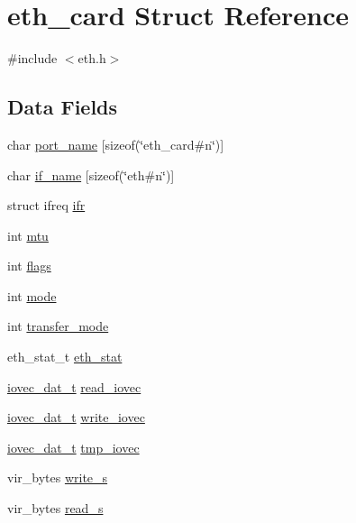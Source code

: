 \hypertarget{structeth__card}{}\section{eth\+\_\+card Struct Reference}
\label{structeth__card}


{\ttfamily \#include $<$eth.\+h$>$}

\subsection*{Data Fields}
\begin{DoxyCompactItemize}
\item 
char \hyperlink{structeth__card_aac454ceb9ecfa543e7aaac535e33e536}{port\+\_\+name} \mbox{[}sizeof(\char`\"{}eth\+\_\+card\#n\char`\"{})\mbox{]}
\item 
char \hyperlink{structeth__card_ad615009a0f37efe148e0d0f20487670b}{if\+\_\+name} \mbox{[}sizeof(\char`\"{}eth\#n\char`\"{})\mbox{]}
\item 
struct ifreq \hyperlink{structeth__card_ad51b4ffb80743dbef0392dfaf3814bf4}{ifr}
\item 
int \hyperlink{structeth__card_a5f8594e356005c64e4a2625755b6c849}{mtu}
\item 
int \hyperlink{structeth__card_ac8bf36fe0577cba66bccda3a6f7e80a4}{flags}
\item 
int \hyperlink{structeth__card_a1ea5d0cb93f22f7d0fdf804bd68c3326}{mode}
\item 
int \hyperlink{structeth__card_aa59025dc15d9260cdf9389d0a66c7804}{transfer\+\_\+mode}
\item 
eth\+\_\+stat\+\_\+t \hyperlink{structeth__card_a83f889144d1e43c0cd130bc51f14350b}{eth\+\_\+stat}
\item 
\hyperlink{eth_8h_abdec48788bda4ee60b73595dc65e65d5}{iovec\+\_\+dat\+\_\+t} \hyperlink{structeth__card_a646fea47457cd5bcd8ae53d33de606c4}{read\+\_\+iovec}
\item 
\hyperlink{eth_8h_abdec48788bda4ee60b73595dc65e65d5}{iovec\+\_\+dat\+\_\+t} \hyperlink{structeth__card_a4848915b06b19c977c691138f361f662}{write\+\_\+iovec}
\item 
\hyperlink{eth_8h_abdec48788bda4ee60b73595dc65e65d5}{iovec\+\_\+dat\+\_\+t} \hyperlink{structeth__card_ac9db8f91c9cd186a23a4de567da2e87e}{tmp\+\_\+iovec}
\item 
vir\+\_\+bytes \hyperlink{structeth__card_a4dc611dff34a652e69dbcd42ecd81940}{write\+\_\+s}
\item 
vir\+\_\+bytes \hyperlink{structeth__card_aad26cb8272451cf5ef65501662f51e91}{read\+\_\+s}

\end{DoxyCompactItemize}
